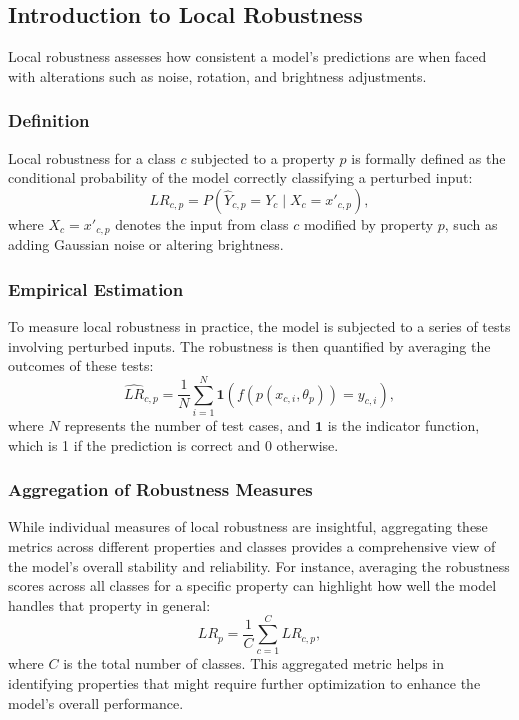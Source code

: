 \documentclass[10pt, conference, a4paper, final]{IEEEtran}
\begin{document}
    \subsection{Introduction to Local Robustness}
    Local robustness  assesses how consistent a model's predictions are when faced with alterations such as noise, rotation, and brightness adjustments. 
    \subsubsection{Definition}
    Local robustness for a class \(c\) subjected to a property \(p\) is formally defined as the conditional probability of the model correctly classifying a perturbed input:
    \begin{equation}
        LR_{c,p} = P(\hat{Y}_{c,p} = Y_c \mid X_c = x'_{c,p}),
    \end{equation}
    where \(X_c = x'_{c,p}\) denotes the input from class \(c\) modified by property \(p\), such as adding Gaussian noise or altering brightness.
    
    
    \subsubsection{Empirical Estimation}
    To measure local robustness in practice, the model is subjected to a series of tests involving perturbed inputs. The robustness is then quantified by averaging the outcomes of these tests:
    \begin{equation}
        \hat{LR}_{c,p} = \frac{1}{N} \sum_{i=1}^N \mathbf{1}(f(p(x_{c,i}, \theta_p)) = y_{c,i}),
    \end{equation}
    where \(N\) represents the number of test cases, and \(\mathbf{1}\) is the indicator function, which is 1 if the prediction is correct and 0 otherwise. 

    \subsubsection{Aggregation of Robustness Measures}
    While individual measures of local robustness are insightful, aggregating these metrics across different properties and classes provides a comprehensive view of the model's overall stability and reliability. For instance, averaging the robustness scores across all classes for a specific property can highlight how well the model handles that property in general:
    \begin{equation}
        LR_p = \frac{1}{C} \sum_{c=1}^C LR_{c,p},
    \end{equation}
    where \(C\) is the total number of classes. This aggregated metric helps in identifying properties that might require further optimization to enhance the model's overall performance.
\end{document}
